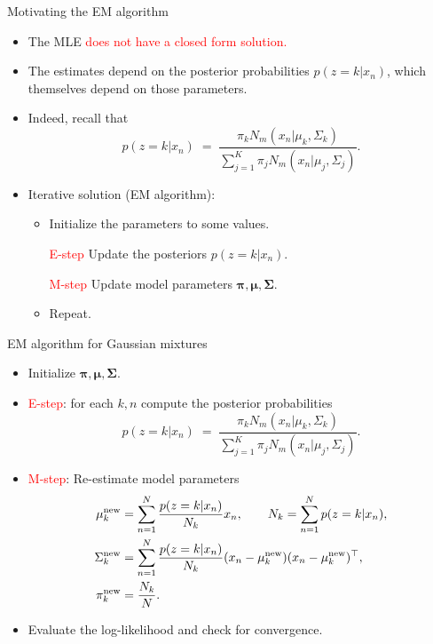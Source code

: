 \documentclass[11pt,handout,aspectratio=169]{beamer}
\begin{document}
\begin{frame}{Motivating the EM algorithm}
\begin{itemize}
	\item The MLE \textcolor{red}{does not have a closed form solution.}
	\item The estimates depend on the posterior probabilities $p(z=k|x_n)$, which themselves depend on those parameters.
	\item Indeed, recall that $$p(z=k|x_n)\;=\;\frac{\pi_k N_m(x_n|\mu_k,\Sigma_k)}{\sum_{j=1}^K \pi_j N_m(x_n|\mu_j,\Sigma_j)}.
$$
\item Iterative solution (EM algorithm):
\begin{itemize}
\item Initialize the parameters to some values.
\item [\textcolor{red}{E-step}] Update the posteriors $p(z=k|x_n)$.
\item [\textcolor{red}{M-step}] Update model parameters $\boldsymbol\pi,\boldsymbol\mu,\boldsymbol\Sigma$.
\item Repeat.
\end{itemize}
\end{itemize}
\end{frame}


\begin{frame}[label=GMEM]{EM algorithm for Gaussian mixtures}
	\begin{itemize}
		\item Initialize $\boldsymbol\pi,\boldsymbol\mu,\boldsymbol\Sigma$.
		\item \textcolor{red}{E-step}: for each $k,n$ compute the posterior probabilities $$p(z=k|x_n)\;=\;\frac{\pi_k N_m(x_n|\mu_k,\Sigma_k)}{\sum_{j=1}^K \pi_j N_m(x_n|\mu_j,\Sigma_j)}.$$
		\item \textcolor{red}{M-step}: Re-estimate model parameters
		\begin{align*}
			\mu_k^{\rm new} & =\sum_{n=1}^N \frac{p(z=k|x_n)}{N_k}x_n,\qquad N_k=\sum_{n=1}^N p(z=k|x_n),\\
			\Sigma_k^{\rm new} & = \sum_{n=1}^N \frac{p(z=k|x_n)}{N_k}(x_n-\mu_k^{\rm new})(x_n-\mu_k^{\rm new})^\top,\\
			\pi_k^{\rm new} & = \frac{N_k}{N}.
		\end{align*}
		\item Evaluate the log-likelihood and check for convergence. 
	\end{itemize}
\end{frame}
\end{document}
